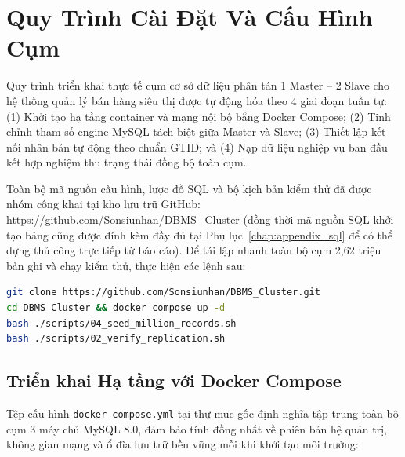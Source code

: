 \documentclass[12pt,a4paper]{report}
\begin{document}
\chapter{Quy Trình Cài Đặt Và Cấu Hình Cụm}

Quy trình triển khai thực tế cụm cơ sở dữ liệu phân tán 1 Master -- 2 Slave cho hệ thống quản lý bán hàng siêu thị được tự động hóa theo 4 giai đoạn tuần tự: (1) Khởi tạo hạ tầng container và mạng nội bộ bằng Docker Compose; (2) Tinh chỉnh tham số engine MySQL tách biệt giữa Master và Slave; (3) Thiết lập kết nối nhân bản tự động theo chuẩn GTID; và (4) Nạp dữ liệu nghiệp vụ ban đầu kết hợp nghiệm thu trạng thái đồng bộ toàn cụm.

Toàn bộ mã nguồn cấu hình, lược đồ SQL và bộ kịch bản kiểm thử đã được nhóm công khai tại kho lưu trữ GitHub: \url{https://github.com/Sonsiunhan/DBMS_Cluster} (đồng thời mã nguồn SQL khởi tạo bảng cũng được đính kèm đầy đủ tại Phụ lục~\ref{chap:appendix_sql} để có thể dựng thủ công trực tiếp từ báo cáo). Để tái lập nhanh toàn bộ cụm 2,62 triệu bản ghi và chạy kiểm thử, thực hiện các lệnh sau:

\begin{lstlisting}[language=bash, caption={Lệnh tải mã nguồn và khởi tạo tự động toàn bộ cụm từ kho lưu trữ GitHub}]
git clone https://github.com/Sonsiunhan/DBMS_Cluster.git
cd DBMS_Cluster && docker compose up -d
bash ./scripts/04_seed_million_records.sh
bash ./scripts/02_verify_replication.sh
\end{lstlisting}

\section{Triển khai Hạ tầng với Docker Compose}
Tệp cấu hình \texttt{docker-compose.yml} tại thư mục gốc định nghĩa tập trung toàn bộ cụm 3 máy chủ MySQL 8.0, đảm bảo tính đồng nhất về phiên bản hệ quản trị, không gian mạng và ổ đĩa lưu trữ bền vững mỗi khi khởi tạo môi trường:
\end{document}
